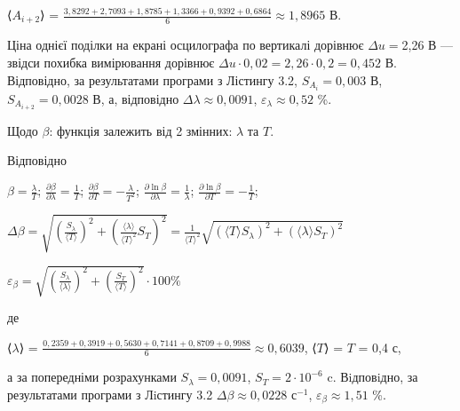 \documentclass[12pt,a4paper]{article}
\begin{document}
    \begin{center}
        ⟨$\displaystyle A_{i+2}$⟩ = $\displaystyle \frac{3,8292 + 2,7093 + 1,8785 + 1,3366 + 0,9392 + 0,6864}{6} \approx 1,8965$ В.
    \end{center}

    Ціна однієї поділки на екрані осцилографа по вертикалі дорівнює $\Delta u = $2,26 В --- звідси похибка вимірювання дорівнює $\Delta u \cdot 0,02 = 2,26 \cdot 0,2 = 0,452$ В.
    Відповідно, за результатами програми з Лістингу 3.2, $S_{A_i} = 0,003$ В, $S_{A_{i+2}} = 0,0028$ В, а, відповідно $\Delta \lambda \approx 0,0091$, $\varepsilon_{\lambda} \approx 0,52$ \%.

    Щодо $\beta$: функція залежить від 2 змінних: $\lambda$ та $T$.

    Відповідно

    \begin{center}
        $\displaystyle \beta = \frac{\lambda}{T}$; $\displaystyle \frac{\partial \beta}{\partial \lambda} = \frac{1}{T}$; $\displaystyle \frac{\partial \beta}{\partial T} = -\frac{\lambda}{T^2}$;
        $\displaystyle \frac{\partial \ln \beta}{\partial \lambda} = \frac{1}{\lambda}$; $\displaystyle \frac{\partial \ln \beta}{\partial T} = -\frac{1}{T}$;
    \end{center}

    \begin{center}
        $\displaystyle \Delta \beta = \sqrt{\left( \frac{S_{\lambda}}{\text{⟨}T\text{⟩}} \right)^2 + \left( \frac{\text{⟨}\lambda\text{⟩}}{\text{⟨}T\text{⟩}^2} S_T \right)^2} =
        \frac{1}{\text{⟨}T\text{⟩}^2} \sqrt{\left(\text{⟨}T\text{⟩} S_{\lambda}\right)^2 + \left(\text{⟨}\lambda\text{⟩} S_T\right)^2}$
    \end{center}

    \begin{center}
        $\displaystyle \varepsilon_{\beta} = \sqrt{\left( \frac{S_{\lambda}}{\text{⟨}\lambda\text{⟩} }\right)^2 +
        \left(\frac{S_T}{\text{⟨}T\text{⟩}} \right)^2} \cdot 100 \%$
    \end{center}

    де

    \begin{center}
        ⟨$\lambda$⟩ = $\displaystyle \frac{0,2359 + 0,3919 + 0,5630 + 0,7141 + 0,8709 + 0,9988}{6} \approx 0,6039$, ⟨$T$⟩ = $T$ = 0,4 с,
    \end{center}

    а за попередніми розрахунками $S_{\lambda} = 0,0091$, $S_T = 2 \cdot 10^{-6}$ c. Вiдповiдно, за результатами
    програми з Лiстингу 3.2 $\Delta \beta \approx 0,0228 \text{ с}^{-1}$, $\varepsilon_{\beta} \approx 1,51$ \%.
\end{document}
